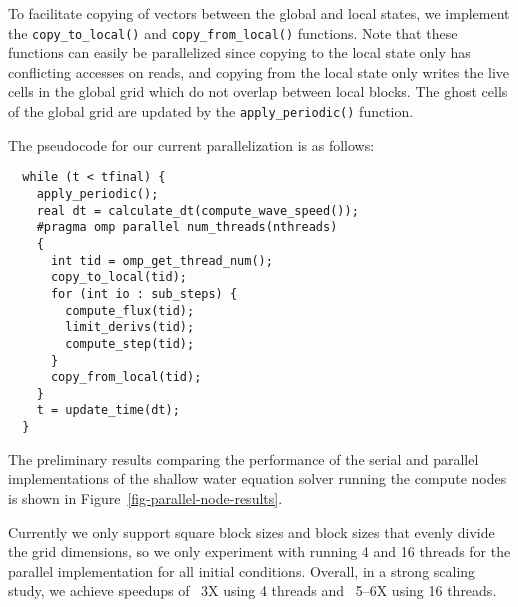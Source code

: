 To facilitate copying of vectors between the global and local states, we
implement the \texttt{copy\_to\_local()} and \texttt{copy\_from\_local()}
functions. Note that these functions can easily be parallelized since
copying to the local state only has conflicting accesses on reads, and
copying from the local state only writes the live cells in the global
grid which do not overlap between local blocks. The ghost cells of the
global grid are updated by the \texttt{apply\_periodic()} function.

The pseudocode for our current parallelization is as follows:

\begin{verbatim}
  while (t < tfinal) {
    apply_periodic();
    real dt = calculate_dt(compute_wave_speed());
    #pragma omp parallel num_threads(nthreads)
    {
      int tid = omp_get_thread_num();
      copy_to_local(tid);
      for (int io : sub_steps) {
        compute_flux(tid);
        limit_derivs(tid);
        compute_step(tid);
      }
      copy_from_local(tid);
    }
    t = update_time(dt);
  }
\end{verbatim}

The preliminary results comparing the performance of the serial and
parallel implementations of the shallow water equation solver running the
compute nodes is shown in Figure~\ref{fig-parallel-node-results}.



Currently we only support square block sizes and block sizes that evenly
divide the grid dimensions, so we only experiment with running 4 and 16
threads for the parallel implementation for all initial
conditions. Overall, in a strong scaling study, we achieve speedups of
~3X using 4 threads and ~5--6X using 16 threads.
